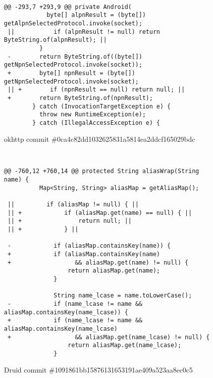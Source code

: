 
\begin{figure*}[H]
\begin{lstlisting}[moredelim={[is][\color{red}]{||}{||}}]

@@ -293,7 +293,9 @@ private Android(
            byte[] alpnResult = (byte[]) getAlpnSelectedProtocol.invoke(socket);
 ||           if (alpnResult != null) return ByteString.of(alpnResult); ||
          }
 -        return ByteString.of((byte[]) getNpnSelectedProtocol.invoke(socket));
 +        byte[] npnResult = (byte[]) getNpnSelectedProtocol.invoke(socket);
 || +        if (npnResult == null) return null; ||
 +        return ByteString.of(npnResult);
        } catch (InvocationTargetException e) {
          throw new RuntimeException(e);
        } catch (IllegalAccessException e) {
\end{lstlisting}
\caption{okhttp commit \#0ca4c82dd1032625831a5814ea2ddcf165029bdc\label{fig:null2}}
\end{figure*}


\begin{figure*}[H]
\begin{lstlisting}[moredelim={[is][\color{red}]{||}{||}}]


@@ -760,12 +760,14 @@ protected String aliasWrap(String name) {
          Map<String, String> aliasMap = getAliasMap();
  
 ||         if (aliasMap != null) { ||
 || +            if (aliasMap.get(name) == null) { ||
 || +                return null; ||
 || +            } ||

 -            if (aliasMap.containsKey(name)) {
 +            if (aliasMap.containsKey(name)
 +            		&& aliasMap.get(name) != null) {
                  return aliasMap.get(name);
              }
              
              String name_lcase = name.toLowerCase();
 -            if (name_lcase != name && aliasMap.containsKey(name_lcase)) {
 +            if (name_lcase != name && aliasMap.containsKey(name_lcase)
 +            		&& aliasMap.get(name_lcase) != null) {
                  return aliasMap.get(name_lcase);
              }

\end{lstlisting}
\caption{Druid commit \#1091861bb15876131653191ae409a523aa8ec0c5\label{fig:null1}}
\end{figure*}

